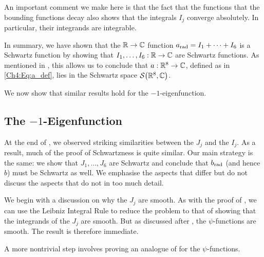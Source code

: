 An important comment we make here is that the fact that the functions that the bounding functions decay also shows that the integrals $I_j$ converge absolutely. In particular, their integrands are integrable.

In summary, we have shown that the $\mathbb{R} \to \mathbb{C}$ function $a_{\operatorname{rad}} = I_1 + \cdots + I_6$ is a Schwartz function by showing that $I_1, \ldots, I_6 : \mathbb{R} \to \mathbb{C}$ are Schwartz functions. As mentioned in , this allows us to conclude that $a : \mathbb{R}^8 \to \mathbb{C}$, defined as in \eqref{Ch4:Eq:a_def}, lies in the Schwartz space $\mathcal{S}\!\left( \mathbb{R}^8, \mathbb{C} \right)$.


We now show that similar results hold for the $-1$-eigenfunction.

\subsection{The $-1$-Eigenfunction}
\label{Ch4:Subec:Schwartzness_b}

At the end of , we observed striking similarities between the $J_j$ and the $I_j$. As a result, much of the proof of Schwartzness is quite similar. Our main strategy is the same: we show that $J_1, \ldots, J_6$ are Schwartz and conclude that $b_{\operatorname{rad}}$ (and hence $b$) must be Schwartz as well. We emphasise the aspects that differ but do not discuss the aspects that do not in too much detail.

We begin with a discussion on why the $J_j$ are smooth. As with the proof of , we can use the Leibniz Integral Rule to reduce the problem to that of showing that the integrands of the $J_j$ are smooth. But as discussed after , the $\psi$-functions are smooth. The result is therefore immediate.

A more nontrivial step involves proving an analogue of  for the $\psi$-functions.

